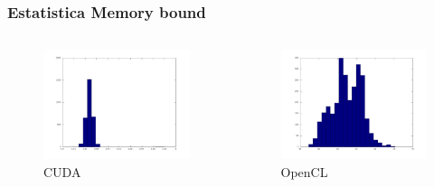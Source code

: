 \documentclass[brazil]{beamer}
\begin{document}
\begin{frame}[fragile]
  \frametitle{Estatistica Memory bound}
  \begin{columns}
    \begin{column}{.5\textwidth}
      \begin{figure}
          \includegraphics[scale=0.15]{resultados_cuda_memory_histo.jpg} \\
          CUDA
      \end{figure}
    \end{column}
    \begin{column}{.5\textwidth}
      \begin{figure}
          \includegraphics[scale=0.15]{resultados_opencl_memory_histo.jpg} \\
          OpenCL
      \end{figure}
    \end{column}
  \end{columns}
\end{frame}
\end{document}
